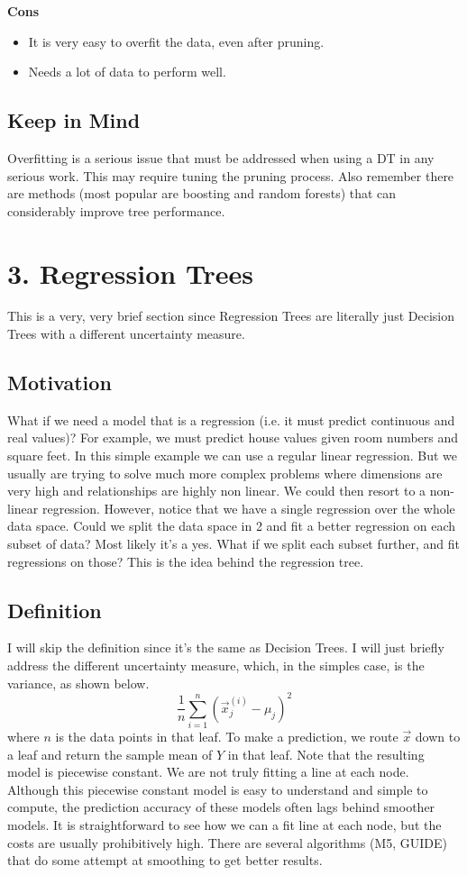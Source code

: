 \documentclass[10pt]{article}
\begin{document}
		\noindent \textbf{Cons}
		\begin{itemize}
			\item It is very easy to overfit the data, even after pruning.
			\item Needs a lot of data to perform well.
		\end{itemize}
	
	\subsection*{Keep in Mind}
		Overfitting is a serious issue that must be addressed when using a DT in any serious work. This may require
		tuning the pruning process. Also remember there are methods (most popular are boosting and random forests)
		that can considerably improve tree performance. \\
	
\section*{3. Regression Trees}
	This is a very, very brief section since Regression Trees are literally just Decision Trees with a different 
	uncertainty measure.
	\subsection*{Motivation}
		 What if we need a model that is a regression (i.e. it must predict continuous and real values)? For example, we 
		 must predict house values given room numbers and square feet. In this simple example we can use a regular
		 linear regression. But we usually are trying to solve much more complex problems where dimensions are very 
		 high and relationships are highly non linear. We could then resort to a non-linear regression. However, notice 
		 that we have a single regression over the whole data space. Could we split the data space in 2 and fit a 
		 better regression on each subset of data? Most likely it's a yes. What if we split each subset further, and fit 
		 regressions on those? This is the idea behind the regression tree. 
	\subsection*{Definition}
		I will skip the definition since it's the same as Decision Trees. I will just briefly address the different 
		uncertainty measure, which, in the simples case, is the variance, as shown below.
		$$ \frac{1}{n} \sum_{i=1}^{n} (\vec x_j^{(i)} - \mu_j)^2 $$
		where $n$ is the data points in that leaf.
		To make a prediction, we route $ \vec x$ down to a leaf and return the sample mean of $Y$ in that leaf. 
		Note that the resulting model is piecewise constant. We are not truly fitting a line at each node. Although this 
		piecewise constant model is easy to understand and simple to compute, the prediction accuracy of these models often
		lags behind smoother models. It is straightforward to see how we can a fit line at each node, but the costs are usually
		prohibitively high. There are several algorithms (M5, GUIDE) that do some attempt at smoothing to get better results. \\
		 
\end{document}
